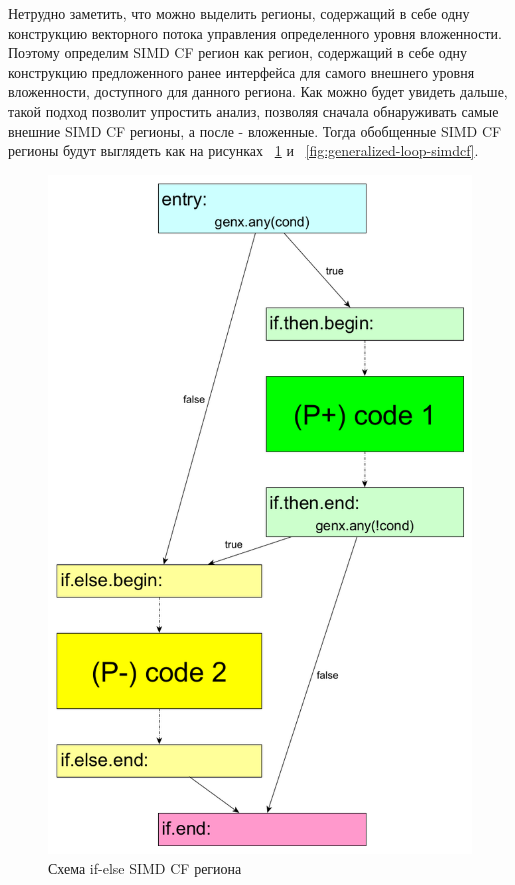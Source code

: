 Нетрудно заметить, что можно выделить регионы, содержащий в себе одну
конструкцию векторного потока управления определенного уровня вложенности.
Поэтому определим SIMD CF регион как регион, содержащий в себе одну конструкцию
предложенного ранее интерфейса для самого внешнего уровня вложенности,
доступного для данного региона. Как можно будет увидеть дальше, такой подход
позволит упростить анализ, позволяя сначала обнаруживать самые внешние SIMD CF
регионы, а после - вложенные. Тогда обобщенные SIMD CF регионы будут выглядеть
как на рисунках ~\ref{fig:generalized-if-simdcf} и ~\ref{fig:generalized-loop-simdcf}.
\begin{figure}
  \centering
  \includegraphics[scale=0.27]{Images/if-else-FE-generalized-colored.png}
  \caption{Схема if-else SIMD CF региона}
  \label{fig:generalized-if-simdcf}
\end{figure}
